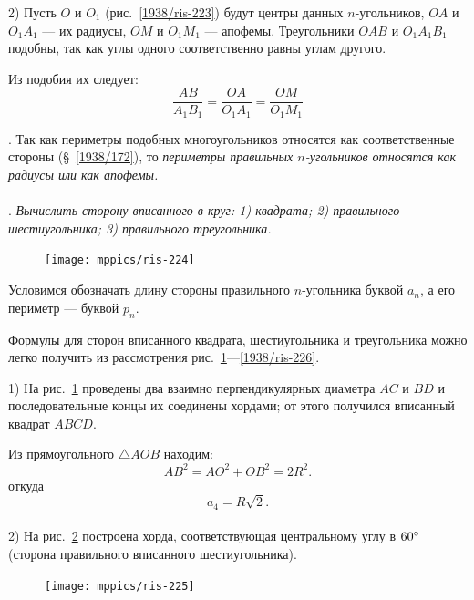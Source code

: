 \documentclass[twoside]{book}
\begin{document}
2) Пусть $O$ и $O_1$ (рис.~\ref{1938/ris-223}) будут центры данных $n$-угольников, $OA$ и $O_1A_1$ — их радиусы, $OM$ и $O_1M_1$ — апофемы.
Треугольники $OAB$ и $O_1A_1B_1$ подобны, так как углы одного соответственно равны углам другого.

Из подобия их следует:
\[\frac{AB}{A_1B_1}=\frac{OA}{O_1A_1} = \frac{OM}{O_1M_1}\]

\smallskip
{}.
Так как периметры подобных многоугольников относятся как соответственные стороны (§~\ref{1938/172}), то \emph{периметры правильных $n$-угольников относятся как радиусы или как апофемы.}


\paragraph{}\label{1938/219}
.
\emph{Вычислить сторону вписанного в круг:
1) квадрата;
2) правильного шестиугольника;
3) правильного треугольника.}

\begin{figure}
\centering
\texttt{[image: mppics/ris-224]}
\caption{}\label{1938/ris-224}
\end{figure}

Условимся обозначать длину стороны правильного $n$-угольника буквой $a_n$, а его периметр — буквой $p_n$.

Формулы для сторон вписанного квадрата, шестиугольника и треугольника можно легко получить из рассмотрения рис.~\ref{1938/ris-224}—\ref{1938/ris-226}.

1) На рис.~\ref{1938/ris-224} проведены два взаимно перпендикулярных диаметра $AC$ и $BD$ и последовательные концы их соединены хордами;
от этого получился вписанный квадрат $ABCD$.


Из прямоугольного $\triangle AOB$ находим:
\[AB^2=AO^2+OB^2=2R^2.\]
откуда
\[a_4=R\sqrt2.\]

\paragraph{}\label{1938/220}
2) На рис.~\ref{1938/ris-225} построена хорда, соответствующая центральному углу в $60\degree$ (сторона правильного вписанного шестиугольника).

\begin{figure}
\vskip-4mm
\centering
\texttt{[image: mppics/ris-225]}
\caption{}\label{1938/ris-225}
\end{figure}
\end{document}
